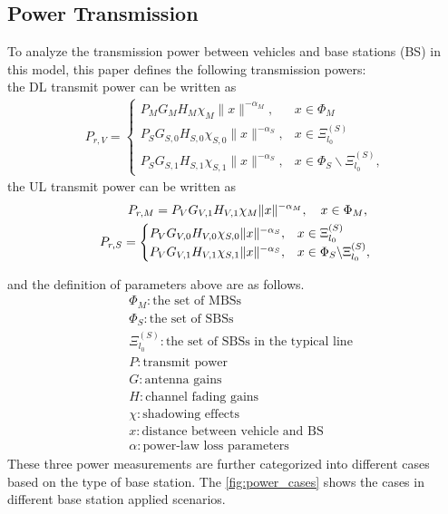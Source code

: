 \documentclass[conference]{IEEEtran}
\begin{document}
\begin{CJK*}{UTF8}{bsmi}
\subsection{Power Transmission}
To analyze the transmission power between vehicles and base stations (BS) in this model, this paper defines the following transmission powers:\\
the DL transmit power can be written as
$$
\begin{aligned}
P_{r, V}=
\begin{cases}
P_M G_M H_M \chi_M\|x\|^{-\alpha_M}, & x \in \Phi_M \\
P_S G_{S, 0} H_{S, 0} \chi_{S, 0}\|x\|^{-\alpha_S}, & x \in \Xi_{l_0}^{(S)} \\
P_S G_{S, 1} H_{S, 1} \chi_{S, 1}\|x\|^{-\alpha_S}, & x \in \Phi_S \backslash \Xi_{l_0}^{(S)},
\end{cases}
\end{aligned}
$$
the UL transmit power can be written as
$$
\begin{aligned}
P_{r, M}=P_V G_{V, 1} H_{V, 1} \chi_M\|x\|^{-\alpha_M}, \quad x \in \Phi_M \text {, } \\
P_{r, S}= \begin{cases}P_V G_{V, 0} H_{V, 0} \chi_{S, 0}\|x\|^{-\alpha_S}, & x \in \Xi_{l_0}^{(S)} \\
P_V G_{V, 1} H_{V, 1} \chi_{S, 1}\|x\|^{-\alpha_S}, & x \in \Phi_S \backslash \Xi_{l_0}^{(S)},\end{cases} \\
\end{aligned}\\
$$

and the definition of parameters above are as follows.
$$
\begin{aligned}
&\Phi_M: \text {the set of MBSs}\\
&\Phi_S:  \text {the set of SBSs}\\
&\Xi_{l_0}^{(S)}: \text {the set of SBSs in the typical line}\\
&P: \text {transmit power}\\
&G: \text {antenna gains}\\
&H: \text {channel fading gains}\\
&\chi: \text {shadowing effects}\\
&x: \text {distance between vehicle and BS}\\
&\alpha: \text {power-law loss parameters}
\end{aligned}
$$
These three power measurements are further categorized into different cases based on the type of base station.  The \autoref{fig:power_cases} shows the cases in different base station applied scenarios.\\


\end{CJK*}
\end{document}
